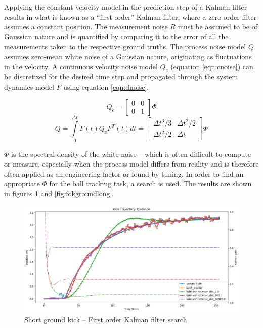 \documentclass[a4paper,twoside,12pt]{report}
\begin{document}
Applying the constant velocity model in the prediction step of a Kalman filter results in what is known as a ``first order'' Kalman filter, where a zero order filter assumes a constant position. The measurement noise $R$ must be assumed to be of Gaussian nature and is quantified by comparing it to the error of all the measurements taken to the respective ground truths. The process noise model $Q$ assumes zero-mean white noise of a Gaussian nature, originating as fluctuations in the velocity. A continuous velocity noise model $Q_c$ (equation \ref{eqn:cnoise}) can be discretized for the desired time step and propagated through the system dynamics model $F$ using equation \ref{eqn:dnoise}. \citep{kalmanpy}

\begin{equation} 
Q_c
=
\begin{bmatrix}
    0 & 0 \\
    0 & 1 
\end{bmatrix}
\Phi
\label{eqn:cnoise}
\end{equation}
\begin{equation} 
Q = \int\limits_0^{\Delta t} F(t)Q_cF^T(t)dt
=
\begin{bmatrix}
    \Delta t^3/3 & \Delta t^2/2 \\
    \Delta t^2/2 & \Delta t 
\end{bmatrix}
\Phi
\label{eqn:dnoise}
\end{equation}

$\Phi$ is the spectral density of the white noise -- which is often difficult to compute or measure, especially when the process model differs from reality and is therefore often applied as an engineering factor or found by tuning. In order to find an appropriate $\Phi$ for the ball tracking task, a search is used. The results are shown in figures \ref{fig:fokgroundshort} and \ref{fig:fokgroundlong}.

\begin{figure}[h!]
\begin{center}
\includegraphics[width=12cm]{images/fok_ground_short.png}
\caption{Short ground kick -- First order Kalman filter search}
\label{fig:fokgroundshort}
\end{center}
\end{figure}
\end{document}
